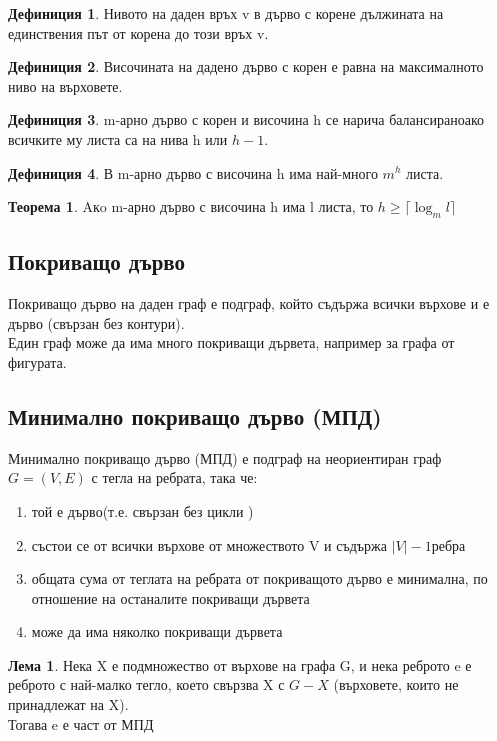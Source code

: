 \documentclass[fleqn, 12pt]{article}
\theoremstyle{definition}
\newtheorem{definition}{Дефиниция}[subsection]
\newtheorem{theorem}{Теорема}[subsection]
\newtheorem{lemma}{Лема}[subsection]
\begin{document}
\begin{definition}
Нивото на даден връх v в дърво с корене дължината на единствения път от корена до този връх v.
\end{definition}

\begin{definition}
Височината на дадено дърво с корен е равна на максималното ниво на върховете.
\end{definition}

\begin{definition}
m-арно дърво с корен и височина h се нарича балансираноако всичките му листа са на нива h или $h - 1$.
\end{definition}

\begin{definition}
В m-арно дърво с височина h има най-много $m^h$ листа.
\end{definition}

\begin{theorem}
Aкo m-арно дърво с височина h има l листа, то $h \geq \lceil \log_{m}{l} \rceil$
\end{theorem}

\subsection{Покриващо дърво}
Покриващо дърво на даден граф е подграф, който съдържа всички върхове и е дърво (свързан без контури).\\
Един граф може да има много покриващи дървета, например за графа от фигурата.

\subsection{Минимално покриващо дърво (МПД)}
Минимално покриващо дърво (МПД) е подграф на неориентиран граф $G=(V,E)$ с тегла на ребрата, така че:
\begin{enumerate}
\item той е дърво(т.е. свързан без цикли )
\item състои се от всички върхове от множеството V и съдържа $|V| - 1$ребра
\item общата сума от теглата на ребрата от покриващото дърво е минимална, по отношение на останалите покриващи дървета
\item може да има няколко покриващи дървета
\end{enumerate}

\begin{lemma}
Нека X е подмножество от върхове на графа G, и нека реброто e е реброто с най-малко тегло, което свързва X с $G-X$ (върховете, които не принадлежат на X).\\
Тогава e е част от МПД
\end{lemma}
\end{document}

